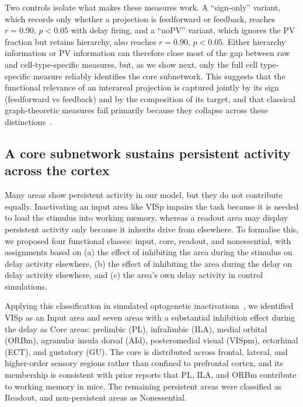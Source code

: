 \documentclass[11pt]{article}
\begin{document}
Two controls isolate what makes these measures work. A ``sign-only'' variant, which records only whether a projection is feedforward or feedback, reaches $r=0.90$, $p<0.05$ with delay firing, and a ``noPV'' variant, which ignores the PV fraction but retains hierarchy, also reaches $r=0.90$, $p<0.05$. Either hierarchy information or PV information can therefore close most of the gap between raw and cell-type-specific measures, but, as we show next, only the full cell type-specific measure reliably identifies the core subnetwork. This suggests that the functional relevance of an interareal projection is captured jointly by its sign (feedforward vs feedback) and by the composition of its target, and that classical graph-theoretic measures fail primarily because they collapse across these distinctions~\cite{wang2020macroscopic}.

\subsection{A core subnetwork sustains persistent activity across the cortex}

Many areas show persistent activity in our model, but they do not contribute equally. Inactivating an input area like VISp impairs the task because it is needed to load the stimulus into working memory, whereas a readout area may display persistent activity only because it inherits drive from elsewhere. To formalise this, we proposed four functional classes: input, core, readout, and nonessential, with assignments based on (a) the effect of inhibiting the area during the stimulus on delay activity elsewhere, (b) the effect of inhibiting the area during the delay on delay activity elsewhere, and (c) the area's own delay activity in control simulations.

Applying this classification in simulated optogenetic inactivations~\cite{guo2017maintenance,bolkan2017thalamic}, we identified VISp as an Input area and seven areas with a substantial inhibition effect during the delay as Core areas: prelimbic (PL), infralimbic (ILA), medial orbital (ORBm), agranular insula dorsal (AId), posteromedial visual (VISpm), ectorhinal (ECT), and gustatory (GU). The core is distributed across frontal, lateral, and higher-order sensory regions rather than confined to prefrontal cortex, and its membership is consistent with prior reports that PL, ILA, and ORBm contribute to working memory in mice. The remaining persistent areas were classified as Readout, and non-persistent areas as Nonessential.
\end{document}
